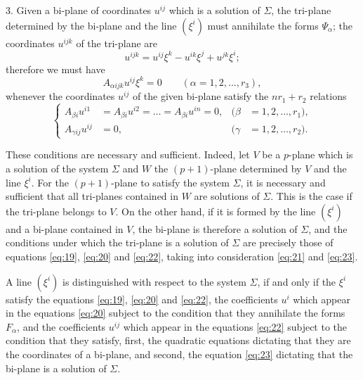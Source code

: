 3. Given a bi-plane of coordinates $u^{ij}$ which is a solution of $\Sigma$, the tri-plane determined by the bi-plane and the line $(\xi^{i})$ must annihilate the forms $\Psi_{\alpha}$; the coordinates $u^{ijk}$ of the tri-plane are
\[
u^{ijk}=u^{ij}\xi^{k}-u^{ik}\xi^{j}+u^{jk}\xi^{i};
\]
therefore we must have
\begin{equation}
\label{eq:22}
  A_{\alpha ijk}u^{ij}\xi^{k}=0\qquad (\alpha=1,2,\dots,r_{3}),
\end{equation}
whenever the coordinates $u^{ij}$ of the given bi-plane satisfy the $nr_{1}+r_{2}$ relations
\begin{equation}
\label{eq:23}
  \left\{
    \begin{aligned}
      A_{\beta i}u^{i1}&=A_{\beta i}u^{i2}=\dots =A_{\beta i}u^{i n}=0,&(\beta&=1,2,\dots,r_{1}),\\
      A_{\gamma ij}u^{ij}&=0,&(\gamma&=1,2,\dots,r_{2}).
    \end{aligned}
  \right.
\end{equation}

These conditions are necessary and sufficient. Indeed, let $V$ be a $p$-plane which is a solution of the system $\Sigma$ and $W$ the $(p+1)$-plane determined by $V$ and the line $\xi^{i}$. For the $(p+1)$-plane to satisfy the system $\Sigma$, it is necessary and sufficient that all tri-planes contained in $W$ are solutions of $\Sigma$. This is the case if the tri-plane belongs to $V$. On the other hand, if it is formed by the line $(\xi^{i})$ and a bi-plane contained in $V$, the bi-plane is therefore a solution of $\Sigma$, and the conditions under which the tri-plane is a solution of $\Sigma$ are precisely those of equations \eqref{eq:19}, \eqref{eq:20} and \eqref{eq:22}, taking into consideration \eqref{eq:21} and \eqref{eq:23}.

\begin{concl*}
  A line $(\xi^{i})$ is distinguished with respect to the system $\Sigma$, if and only if the $\xi^{i}$ satisfy the equations \eqref{eq:19}, \eqref{eq:20} and \eqref{eq:22}, the coefficients $u^{i}$ which appear in the equations \eqref{eq:20}  subject to the  condition that they annihilate the forms $F_{\alpha}$, and the coefficients $u^{ij}$ which appear in the equations \eqref{eq:22}  subject to the condition that they satisfy, first, the quadratic equations dictating that they are the coordinates of a bi-plane, and second, the equation \eqref{eq:23} dictating that the bi-plane is a solution of $\Sigma$.
\end{concl*}

